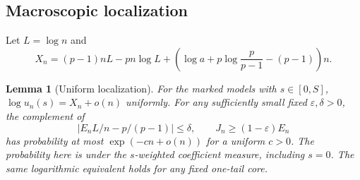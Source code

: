 \documentclass[11pt,a4paper]{article}
\numberwithin{equation}{section}
\newtheorem{lemma}[theorem]{Lemma}
\theoremstyle{definition}
\theoremstyle{remark}
\begin{document}
\subsection{Macroscopic localization}
Let $L=\log n$ and
\begin{equation}
 X_n=(p-1)nL-pn\log L+
 \left(\log a+p\log\frac p{p-1}-(p-1)\right)n.
 \label{eq:X}
\end{equation}
\begin{lemma}[Uniform localization]
\label{lem:macro}
For the marked models with $s\in[0,S]$, $\log u_n(s)=X_n+o(n)$ uniformly.
For any sufficiently small fixed $\varepsilon,\delta>0$, the complement of
\begin{equation}
 \left|E_nL/n-p/(p-1)\right|\le\delta,
 \qquad J_n\ge(1-\varepsilon)E_n
 \label{eq:good}
\end{equation}
has probability at most $\exp(-cn+o(n))$ for a uniform $c>0$. The
probability here is under the $s$-weighted coefficient measure, including
$s=0$. The same logarithmic equivalent holds for any fixed one-tail core.
\end{lemma}
\end{document}
